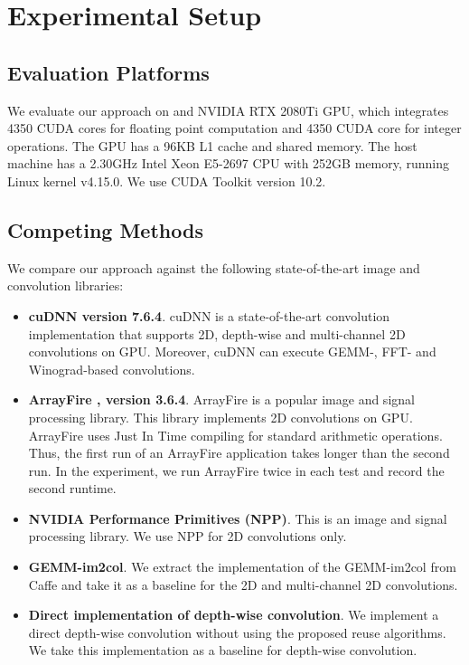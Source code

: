 

\section{Experimental Setup}

\subsection{Evaluation Platforms} We evaluate our approach on and NVIDIA RTX 2080Ti GPU, which integrates 4350 CUDA cores for floating
point computation  and 4350 CUDA core for integer operations. The GPU has a 96KB L1 cache and shared memory. The host machine has a 2.30GHz
Intel Xeon E5-2697 CPU with 252GB memory, running Linux kernel v4.15.0. We use CUDA Toolkit version 10.2.


\subsection{Competing Methods} We compare our approach against the following state-of-the-art image and convolution libraries:
\begin{itemize}
  \item \textbf{cuDNN version 7.6.4}. cuDNN is a state-of-the-art convolution implementation that supports 2D, depth-wise and multi-channel 2D convolutions
      on GPU. Moreover, cuDNN can execute GEMM-, FFT- and Winograd-based convolutions.
  \item \textbf{ArrayFire \cite{Yalamanchili2015}, version 3.6.4}. ArrayFire is a popular image and signal processing library. This
      library implements 2D convolutions on GPU. ArrayFire uses Just In Time compiling for standard arithmetic operations. Thus, the
      first run of an ArrayFire application takes longer than the second run. In the experiment, we run ArrayFire twice in each test and
      record the second runtime.
  \item \textbf{NVIDIA Performance Primitives (NPP)}. This is an image and signal processing library. We use NPP for 2D convolutions
      only.
  \item \textbf{GEMM-im2col}. We extract the implementation of the GEMM-im2col from Caffe \cite{jia2014caffe} and take it as a baseline
      for the 2D and multi-channel 2D convolutions.
  \item \textbf{Direct implementation of depth-wise convolution}. We implement a direct depth-wise convolution without using the proposed reuse algorithms. We take this implementation as a baseline for depth-wise convolution.

\end{itemize}

